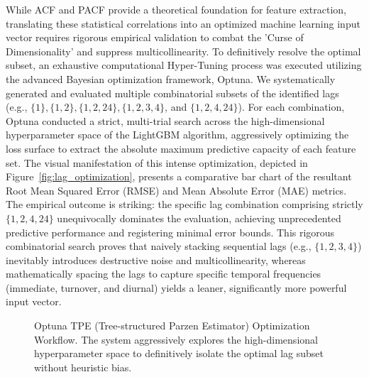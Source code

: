 \documentclass[pdflatex,sn-mathphys-num]{sn-jnl}%
\theoremstyle{thmstyleone}%
\theoremstyle{thmstyletwo}%
\theoremstyle{thmstylethree}%
\begin{document}
While ACF and PACF provide a theoretical foundation for feature extraction, translating these statistical correlations into an optimized machine learning input vector requires rigorous empirical validation to combat the 'Curse of Dimensionality' and suppress multicollinearity. To definitively resolve the optimal subset, an exhaustive computational Hyper-Tuning process was executed utilizing the advanced Bayesian optimization framework, Optuna. We systematically generated and evaluated multiple combinatorial subsets of the identified lags (e.g., $\{1\}, \{1, 2\}, \{1, 2, 24\}, \{1, 2, 3, 4\}$, and $\{1, 2, 4, 24\}$). For each combination, Optuna conducted a strict, multi-trial search across the high-dimensional hyperparameter space of the LightGBM algorithm, aggressively optimizing the loss surface to extract the absolute maximum predictive capacity of each feature set. The visual manifestation of this intense optimization, depicted in Figure~\ref{fig:lag_optimization}, presents a comparative bar chart of the resultant Root Mean Squared Error (RMSE) and Mean Absolute Error (MAE) metrics. The empirical outcome is striking: the specific lag combination comprising strictly $\{1, 2, 4, 24\}$ unequivocally dominates the evaluation, achieving unprecedented predictive performance and registering minimal error bounds. This rigorous combinatorial search proves that naively stacking sequential lags (e.g., $\{1, 2, 3, 4\}$) inevitably introduces destructive noise and multicollinearity, whereas mathematically spacing the lags to capture specific temporal frequencies (immediate, turnover, and diurnal) yields a leaner, significantly more powerful input vector.

\begin{figure}[htbp]
\centering
{}
\caption{Optuna TPE (Tree-structured Parzen Estimator) Optimization Workflow. The system aggressively explores the high-dimensional hyperparameter space to definitively isolate the optimal lag subset without heuristic bias.}\label{fig:optuna_flow}
\end{figure}
\end{document}
